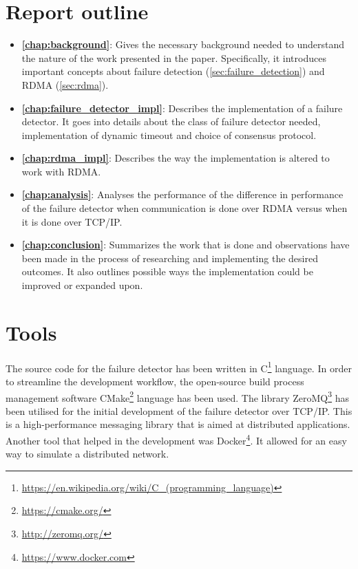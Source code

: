 \documentclass[bsc,frontabs,twoside,singlespacing,parskip,deptreport,hidel]{infthesis}     %
\begin{document}
\section{Report outline}
\begin{itemize}
  \item \textbf{\autoref{chap:background}}: Gives the necessary background needed to understand the nature of the work presented in the paper. Specifically, it introduces important concepts about failure detection (\autoref{sec:failure_detection}) and RDMA (\autoref{sec:rdma}).
  \item \textbf{\autoref{chap:failure_detector_impl}}: Describes the implementation of a failure detector. It goes into details about the class of failure detector needed, implementation of dynamic timeout and choice of consensus protocol.
  \item \textbf{\autoref{chap:rdma_impl}}: Describes the way the implementation is altered to work with RDMA. 
  \item \textbf{\autoref{chap:analysis}}: Analyses the performance of the difference in performance of the failure detector when communication is done over RDMA versus when it is done over TCP/IP.
  \item \textbf{\autoref{chap:conclusion}}: Summarizes the work that is done and observations have been made in the process of researching and implementing the desired outcomes. It also outlines possible ways the implementation could be improved or expanded upon.
\end{itemize}

\section{Tools}

The source code for the failure detector has been written in C\footnote{\url{https://en.wikipedia.org/wiki/C_(programming_language)}} language. In order to streamline the development workflow, the open-source build process management software CMake\footnote{\url{https://cmake.org/}} language has been used. The library ZeroMQ\footnote{\url{http://zeromq.org/}} has been utilised for the initial development of the failure detector over TCP/IP. This is a high-performance messaging library that is aimed at distributed applications. Another tool that helped in the development was Docker\footnote{\url{https://www.docker.com}}. It allowed for an easy way to simulate a distributed network.
\end{document}
